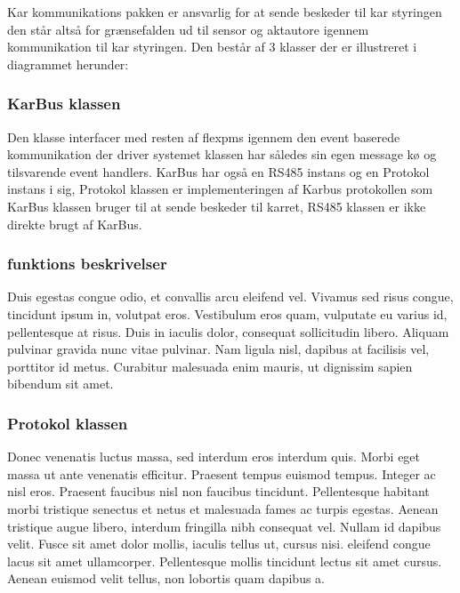 Kar kommunikations pakken er ansvarlig for at sende beskeder til kar styringen den står altså for grænsefalden ud til sensor og aktautore igennem kommunikation til kar styringen. Den består af 3 klasser der er illustreret  i diagrammet herunder:


\subsubsection{KarBus klassen}
Den klasse interfacer med resten af flexpms igennem den event baserede kommunikation der driver systemet klassen har således sin egen message kø og tilsvarende event handlers. KarBus har også en RS485 instans og en Protokol instans i sig, Protokol klassen er implementeringen af Karbus protokollen som KarBus klassen bruger til at sende beskeder til karret, RS485 klassen er ikke direkte brugt af KarBus.


\subsubsection{funktions beskrivelser}
Duis egestas congue odio, et convallis arcu eleifend vel. Vivamus sed risus congue, tincidunt ipsum in, volutpat eros. Vestibulum eros quam, vulputate eu varius id, pellentesque at risus. Duis in iaculis dolor, consequat sollicitudin libero. Aliquam pulvinar gravida nunc vitae pulvinar. Nam ligula nisl, dapibus at facilisis vel, porttitor id metus. Curabitur malesuada enim mauris, ut dignissim sapien bibendum sit amet.

\subsubsection{Protokol klassen}
Donec venenatis luctus massa, sed interdum eros interdum quis. Morbi eget massa ut ante venenatis efficitur. Praesent tempus euismod tempus. Integer ac nisl eros. Praesent faucibus nisl non faucibus tincidunt. Pellentesque habitant morbi tristique senectus et netus et malesuada fames ac turpis egestas. Aenean tristique augue libero, interdum fringilla nibh consequat vel. Nullam id dapibus velit. Fusce sit amet dolor mollis, iaculis tellus ut, cursus nisi.  eleifend congue lacus sit amet ullamcorper. Pellentesque mollis tincidunt lectus sit amet cursus. Aenean euismod velit tellus, non lobortis quam dapibus a.

